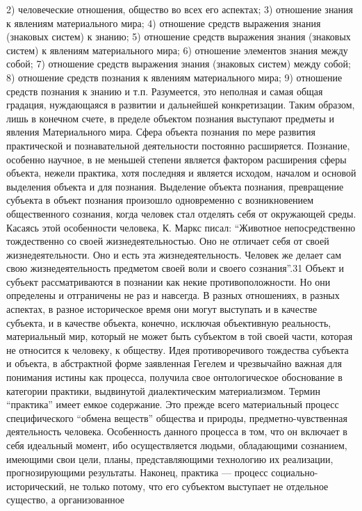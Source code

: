 \documentclass[12pt]{article}
\begin{document}
2) человеческие отношения, общество во всех его аспектах; 3) отношение знания к явлениям материального
мира; 4) отношение средств выражения знания (знаковых систем) к знанию; 5) отношение средств выражения
знания (знаковых систем) к явлениям материального мира; 6) отношение элементов знания между собой; 7)
отношение средств выражения знания (знаковых систем) между собой; 8) отношение средств познания к
явлениям материального мира; 9) отношение средств познания к знанию и т.п. Разумеется, это неполная и самая
общая градация, нуждающаяся в развитии и дальнейшей конкретизации. Таким образом, лишь в конечном
счете, в пределе объектом познания выступают предметы и явления Материального мира.
Сфера объекта познания по мере развития практической и познавательной деятельности постоянно
расширяется. Познание, особенно научное, в не меньшей степени является фактором расширения сферы
объекта, нежели практика, хотя последняя и является исходом, началом и основой выделения объекта и для
познания. Выделение объекта познания, превращение субъекта в объект познания произошло одновременно с
возникновением общественного сознания, когда человек стал отделять себя от окружающей среды. Касаясь этой
особенности человека, К. Маркс писал: “Животное непосредственно тождественно со своей
жизнедеятельностью. Оно не отличает себя от своей жизнедеятельности. Оно и есть эта жизнедеятельность.
Человек же делает сам свою жизнедеятельность предметом своей воли и своего сознания”.31
Объект и субъект рассматриваются в познании как некие противоположности. Но они определены и
отграничены не раз и навсегда. В разных отношениях, в разных аспектах, в разное историческое время они
могут выступать и в качестве субъекта, и в качестве объекта, конечно, исключая объективную реальность,
материальный мир, который не может быть субъектом в той своей части, которая не относится к человеку, к
обществу.
Идея противоречивого тождества субъекта и объекта, в абстрактной форме заявленная Гегелем и чрезвычайно
важная для понимания истины как процесса, получила свое онтологическое обоснование в категории практики,
выдвинутой диалектическим материализмом. Термин “практика” имеет емкое содержание. Это прежде всего
материальный процесс специфического “обмена веществ” общества и природы, предметно-чувственная
деятельность человека. Особенность данного процесса в том, что он включает в себя идеальный момент, ибо
осуществляется людьми, обладающими сознанием, имеющими свои цели, планы, представляющими
технологию их реализации, прогнозирующими результаты. Наконец, практика — процесс социально-исторический, не только потому, что его субъектом выступает не отдельное существо, а организованное
\end{document}

